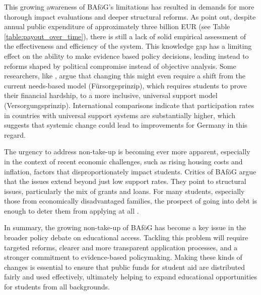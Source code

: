 This growing awareness of BAföG’s limitations has resulted in demands for more thorough impact evaluations and deeper structural reforms. As \cite{meier_bafog_2024} point out, despite annual public expenditure of approximately three billion EUR (see Table \ref{table:payout_over_time}), there is still a lack of solid empirical assessment of the effectiveness and efficiency of the system. This knowledge gap has a limiting effect on the ability to make evidence based policy decisions, leading instead to reforms shaped by political compromise instead of objective analysis. Some researchers, like \cite{gwosc_krisenbewaltigung_2022}, argue that changing this might even require a shift from the current needs-based model (Fürsorgeprinzip), which requires students to prove their financial hardship, to a more inclusive, universal support model (Versorgungsprinzip). International comparisons indicate that participation rates in countries with universal support systems are substantially higher, which suggests that systemic change could lead to improvements for Germany in this regard.

The urgency to address non-take-up is becoming ever more apparent, especially in the context of recent economic challenges, such as rising housing costs and inflation, factors that disproportionately impact students. Critics of BAföG argue that the issues extend beyond just low support rates. They point to structural issues, particularly the mix of grants and loans. For many students, especially those from economically disadvantaged families, the prospect of going into debt is enough to deter them from applying at all \citep{staack_von_2017, gwosc_krisenbewaltigung_2022}.


In summary, the growing non-take-up of BAföG has become a key issue in the broader policy debate on educational access. 
Tackling this problem will require targeted reforms, clearer and more transparent application processes, and a stronger commitment to evidence-based policymaking. 
Making these kinds of changes is essential to ensure that public funds for student aid are distributed fairly and used effectively, ultimately helping to expand educational opportunities for students from all backgrounds.

